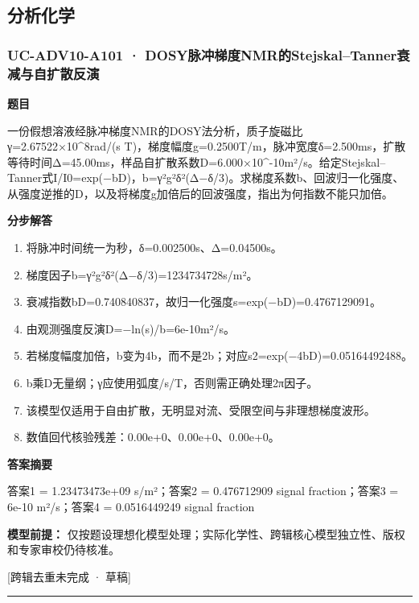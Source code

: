 \documentclass[UTF8,11pt,a4paper]{ctexart}
\begin{document}
\subsection*{分析化学}
\subsubsection*{UC-ADV10-A101 · DOSY脉冲梯度NMR的Stejskal–Tanner衰减与自扩散反演}
\noindent\textbf{题目}\par
一份假想溶液经脉冲梯度NMR的DOSY法分析，质子旋磁比γ=2.67522×10\textasciicircum{}8rad/(s T)，梯度幅度g=0.2500T/m，脉冲宽度δ=2.500ms，扩散等待时间Δ=45.00ms，样品自扩散系数D=6.000×10\textasciicircum{}-10m²/s。给定Stejskal–Tanner式I/I0=exp(−bD)，b=γ²g²δ²(Δ−δ/3)。求梯度系数b、回波归一化强度、从强度逆推的D，以及将梯度g加倍后的回波强度，指出为何指数不能只加倍。\par
\medskip\noindent\textbf{分步解答}
\begin{enumerate}
\item 将脉冲时间统一为秒，δ=0.002500s、Δ=0.04500s。
\item 梯度因子b=γ²g²δ²(Δ−δ/3)=1234734728s/m²。
\item 衰减指数bD=0.740840837，故归一化强度s=exp(−bD)=0.4767129091。
\item 由观测强度反演D=−ln(s)/b=6e-10m²/s。
\item 若梯度幅度加倍，b变为4b，而不是2b；对应s2=exp(−4bD)=0.05164492488。
\item b乘D无量纲；γ应使用弧度/s/T，否则需正确处理2π因子。
\item 该模型仅适用于自由扩散，无明显对流、受限空间与非理想梯度波形。
\item 数值回代核验残差：0.00e+0、0.00e+0、0.00e+0。
\end{enumerate}
\noindent\textbf{答案摘要}\par
答案1 = 1.23473473e+09 s/m²；答案2 = 0.476712909 signal fraction；答案3 = 6e-10 m²/s；答案4 = 0.0516449249 signal fraction\par
\noindent\textbf{模型前提：}
仅按题设理想化模型处理；实际化学性、跨辑核心模型独立性、版权和专家审校仍待核准。\par
\noindent\textcolor{red!65!black}{[跨辑去重未完成 · 草稿]} \par
\medskip\hrule\medskip
{}
\end{document}
